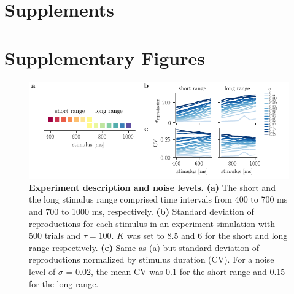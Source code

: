 \documentclass[10pt]{article}
\begin{document}
\pagebreak

\setcounter{section}{0}
\section*{Supplements}

\setcounter{figure}{0}
\setcounter{table}{0}
\setcounter{equation}{0} 
\renewcommand{\figurename}{Supplementary Figure}
\renewcommand{\tablename}{Supplementary Table}

\section*{Supplementary Figures}
\begin{figure}[!htb]
	\centering
	\includegraphics{figures/supp_CV.pdf}
	\caption{\textbf{Experiment description and noise levels.} 
	\textbf{(a)} The short and the long stimulus range comprised time intervals from 400 to 700 ms and 700 to 1000 ms, respectively.
	\textbf{(b)} Standard deviation of reproductions for each stimulus in an experiment simulation with 500 trials and $\tau=100$. $K$ was set to 8.5 and 6 for the short and long range respectively.
	\textbf{(c)} Same as (a) but standard deviation of reproductions normalized by stimulus duration (CV). For a noise level of $\sigma$ = 0.02, the mean CV was 0.1 for the short range and 0.15 for the long range.
	}
\label{sup:CV}
\end{figure}
\end{document}
